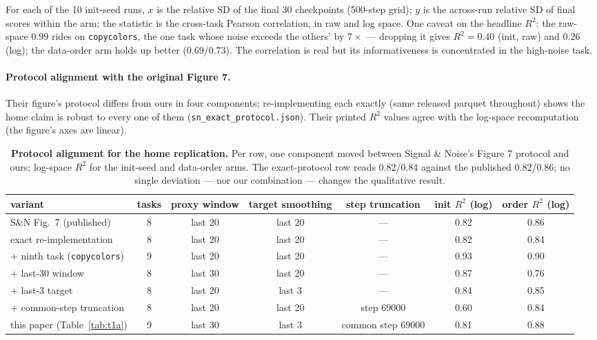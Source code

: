 For each of the 10 init-seed runs, $x$ is the relative SD of the final 30 checkpoints (500-step
grid); $y$ is the across-run relative SD of final scores within the arm; the statistic is the
cross-task Pearson correlation, in raw and log space. One caveat on the headline
$R^2$: the raw-space $0.99$ rides on \texttt{copycolors}, the one task whose noise exceeds the
others' by $7\times$ --- dropping it gives $R^2 = 0.40$ (init, raw) and $0.26$ (log); the
data-order arm holds up better ($0.69$/$0.73$). The correlation is real but its
informativeness is concentrated in the high-noise task.

\paragraph{Protocol alignment with the original Figure 7.} Their figure's protocol differs
from ours in four components; re-implementing each exactly (same released parquet throughout)
shows the home claim is robust to every one of them (\texttt{sn\_exact\_protocol.json}).
Their printed $R^2$ values agree with the log-space recomputation (the figure's axes are linear).

\begin{table}[!htbp]
\centering
\caption{\textbf{Protocol alignment for the home replication.} Per row, one component moved
between Signal \& Noise's Figure 7 protocol and ours; log-space $R^2$ for the init-seed and
data-order arms. The exact-protocol row reads $0.82$/$0.84$ against the published $0.82$/$0.86$; no single
deviation --- nor our combination --- changes the qualitative result.}
\label{tab:t1-align}
\footnotesize
\begin{tabular}{@{}lcccccc@{}}
\toprule
variant & tasks & proxy window & target smoothing & step truncation & init $R^2$ (log) & order $R^2$ (log) \\
\midrule
S\&N Fig.\ 7 (published) & 8 & last 20 & last 20 & --- & 0.82 & 0.86 \\
exact re-implementation & 8 & last 20 & last 20 & --- & 0.82 & 0.84 \\
\quad + ninth task (\texttt{copycolors}) & 9 & last 20 & last 20 & --- & 0.93 & 0.90 \\
\quad + last-30 window & 8 & last 30 & last 20 & --- & 0.87 & 0.76 \\
\quad + last-3 target & 8 & last 20 & last 3 & --- & 0.84 & 0.85 \\
\quad + common-step truncation & 8 & last 20 & last 20 & step $69000$ & 0.60 & 0.84 \\
this paper (Table~\ref{tab:t1a}) & 9 & last 30 & last 3 & common step $69000$ & 0.81 & 0.88 \\
\bottomrule
\end{tabular}
\end{table}

